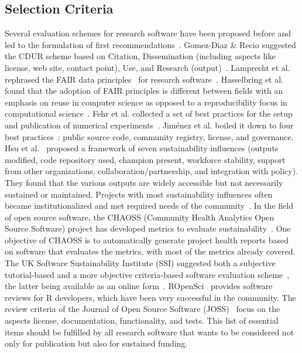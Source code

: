 \documentclass[a4paper,num-refs,numbers,sort&compress]{de-rse}
\begin{document}
\subsection{Selection Criteria}
Several evaluation schemes for research software have been proposed before and led to the formulation of first recommendations~\cite{katerbow2018,https://doi.org/10.2312/os.helmholtz.003}. Gomez-Diaz \& Recio suggested the CDUR scheme based on Citation, Dissemination (including aspects like license, web site, contact point), Use, and Research (output)~\cite{GomezDiaz2019}. Lamprecht et al. rephrased the FAIR data principles~\cite{Wilkinson2016} for research software~\cite{lamprechttowards}. Hasselbring et al. found that the adoption of FAIR principles is different between fields with an emphasis on reuse in computer science as opposed to a reproducibility focus in computational science~\cite{hasselbring2019fair}. Fehr et al. collected a set of best practices for the setup and publication of numerical experiments~\cite{Fehr2016}. Jim\'{e}nez et al. boiled it down to four best practices~\cite{Jimnez2017}: public source code, community registry, license, and governance. Hsu et al.~\cite{Hsu2019} proposed a framework of  seven sustainability influences (outputs modified, code repository used, champion present, workforce stability, support from other organizations, collaboration/partnership, and integration with policy). They found that the various outputs are widely accessible but not necessarily sustained or maintained. Projects with most sustainability influences often became institutionalized and met required needs of the community~\cite{Hsu2019}. In the field of open source software, the CHAOSS (Community Health Analytics Open Source Software) project has developed metrics to evaluate sustainability~\cite{CHAOSS}. One objective of CHAOSS is to automatically generate project health reports based on software that evaluates the metrics, with most of the metrics already covered. The UK Software Sustainability Institute (SSI) suggested both a subjective tutorial-based and a more objective criteria-based software evaluation scheme~\cite{SSIevaluation}, the latter being available as an online form~\cite{SSIsustain}. ROpenSci~\cite{ROpenSciDevGuide} provides software reviews for R developers, which have been very successful in the community. The review criteria of the Journal of Open Source Software (JOSS)~\cite{JOSSReview} focus on the aspects license, documentation, functionality, and tests. This list of essential items should be fulfilled by all research software that wants to be considered not only for publication but also for sustained funding. 
\end{document}
